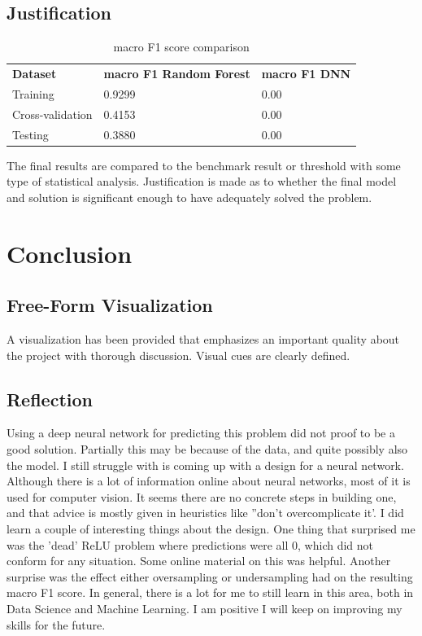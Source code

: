\documentclass[preprint,12pt]{elsarticle}
\begin{document}
\subsection{Justification}

\begin{table}[]
\begin{tabular}{lll}
\textbf{Dataset} & \textbf{macro F1 Random Forest} & \textbf{macro F1 DNN}\\
Training & 0.9299 & 0.00 \\
Cross-validation & 0.4153 & 0.00 \\
Testing & 0.3880 & 0.00
\end{tabular}
\caption{macro F1 score comparison}
\label{table:comparison_F1}
\end{table}
The final results are compared to the benchmark result or threshold with some type of statistical analysis. Justification is made as to whether the final model and solution is significant enough to have adequately solved the problem.

\section{Conclusion}
\label{S:5}

\subsection{Free-Form Visualization}
A visualization has been provided that emphasizes an important quality about the project with thorough discussion. Visual cues are clearly defined.

\subsection{Reflection}
Using a deep neural network for predicting this problem did not proof to be a good solution. Partially this may be because of the data, and quite possibly also the model. I still struggle with is coming up with a design for a neural network. Although there is a lot of information online about neural networks, most of it is used for computer vision. It seems there are no concrete steps in building one, and that advice is mostly given in heuristics like ''don't overcomplicate it'. I did learn a couple of interesting things about the design. One thing that surprised me was the 'dead' ReLU problem where predictions were all 0, which did not conform for any situation. Some online material on this was helpful. Another surprise was the effect either oversampling or undersampling had on the resulting macro F1 score. In general, there is a lot for me to still learn in this area, both in Data Science and Machine Learning. I am positive I will keep on improving my skills for the future.
\end{document}
